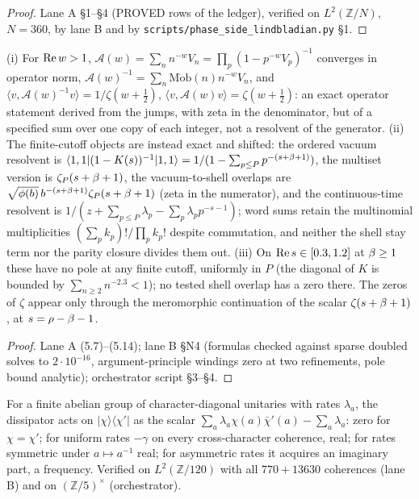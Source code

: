 \begin{proof}
Lane A \S1--\S4 (PROVED rows of the ledger), verified on $L^2(\mathbb Z/N)$, $N = 360$, by lane B and
by \texttt{scripts/phase\_side\_lindbladian.py} \S1.
\end{proof}

\begin{proposition}
\label{prop:phase-vacuum-generating-functions}
(i) For $\operatorname{Re} w>1$, $\mathcal A(w) = \sum_nn^{-w}V_n = \prod_p(1-p^{-w}V_p)^{-1}$ converges in operator norm,
$\mathcal A(w)^{-1} = \sum_n\operatorname{M\ddot ob}(n)n^{-w}V_n$, and $\langle v,\mathcal A(w)^{-1}v\rangle = 1/\zeta(w+\tfrac12)$,
$\langle v,\mathcal A(w)v\rangle = \zeta(w+\tfrac12)$: an exact operator statement derived from the
jumps, with zeta in the denominator, but of a specified sum over one copy of each integer, not a
resolvent of the generator. (ii) The finite-cutoff objects are instead exact and shifted: the ordered
vacuum resolvent is $\langle1,1|(1-K(s))^{-1}|1,1\rangle = 1/(1 - \sum_{p\le P}p^{-(s+\beta+1)})$,
the multiset version is $\zeta_P(s+\beta+1)$, the vacuum-to-shell overlaps are $\sqrt{\phi(b)}\,
b^{-(s+\beta+1)}\zeta_P(s+\beta+1)$ (zeta in the numerator), and the continuous-time resolvent is
$1/(z+\sum_{p\le P}\lambda_p-\sum_p\lambda_pp^{-s-1})$; word sums retain the multinomial multiplicities
$(\sum_pk_p)!/\prod_pk_p!$ despite commutation, and neither the shell stay term nor the parity closure
divides them out. (iii) On $\operatorname{Re} s\in[0.3,1.2]$ at $\beta\ge1$ these have no pole at any finite
cutoff, uniformly in $P$ (the diagonal of $K$ is bounded by $\sum_{n\ge2}n^{-2.3}<1$); no tested shell
overlap has a zero there. The zeros of $\zeta$ appear only through the meromorphic continuation of the
scalar $\zeta(s+\beta+1)$, at $s = \rho-\beta-1$.
\end{proposition}

\begin{proof}
Lane A (5.7)--(5.14); lane B \S N4 (formulas checked against sparse doubled solves to $2\cdot10^{-16}$,
argument-principle windings zero at two refinements, pole bound analytic); orchestrator script \S3--\S4.
\end{proof}

\begin{proposition}
\label{prop:galois-dephasing-rates}
For a finite abelian group of character-diagonal unitaries with rates $\lambda_a$, the dissipator acts
on $|\chi\rangle\langle\chi'|$ as the scalar $\sum_a\lambda_a\chi(a)\bar\chi'(a)-\sum_a\lambda_a$: zero
for $\chi = \chi'$; for uniform rates $-\gamma$ on every cross-character coherence, real; for rates
symmetric under $a\mapsto a^{-1}$ real; for asymmetric rates it acquires an imaginary part, a
frequency. Verified on $L^2(\mathbb Z/120)$ with all $770+13630$ coherences (lane B) and on $(\mathbb Z/5)^\times$
(orchestrator).
\end{proposition}

